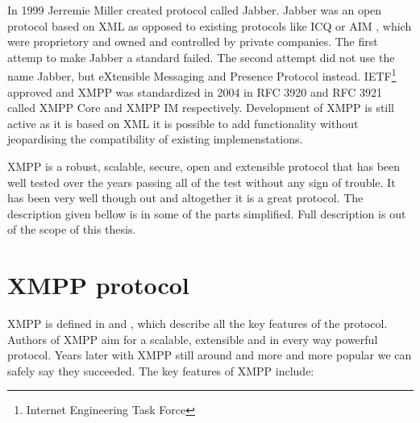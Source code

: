 In 1999 Jerremie Miller created protocol called Jabber. Jabber was an open protocol based on XML as opposed to existing protocols like ICQ \cite{ICQ} or AIM \cite{AIM}, which were proprietory and owned and controlled by private companies. The first attemp to make Jabber a standard failed. The second attempt did not use the name Jabber, but eXtensible Messaging and Presence Protocol instead. IETF\footnote{Internet Engineering Task Force} approved and XMPP was standardized in 2004 in RFC 3920 and RFC 3921 called XMPP Core and XMPP IM respectively. Development of XMPP is still active as it is based on XML it is possible to add functionality without jeopardising the compatibility of existing implemenstations.      

XMPP is a robust, scalable, secure, open and extensible protocol that has been well tested over the years passing all of the test without any sign of trouble. It has been very well though out and altogether it is a great protocol. The description given bellow is in some of the parts simplified. Full description is out of the scope of this thesis.   

\section{XMPP protocol}
XMPP is defined in \cite{xmppCoreRFC} and \cite{xmppIMRFC}, which describe all the key features of the protocol. Authors of XMPP aim for a scalable, extensible and in every way powerful protocol. Years later with XMPP still around and more and more popular we can safely say they succeeded. The key features of XMPP include:

